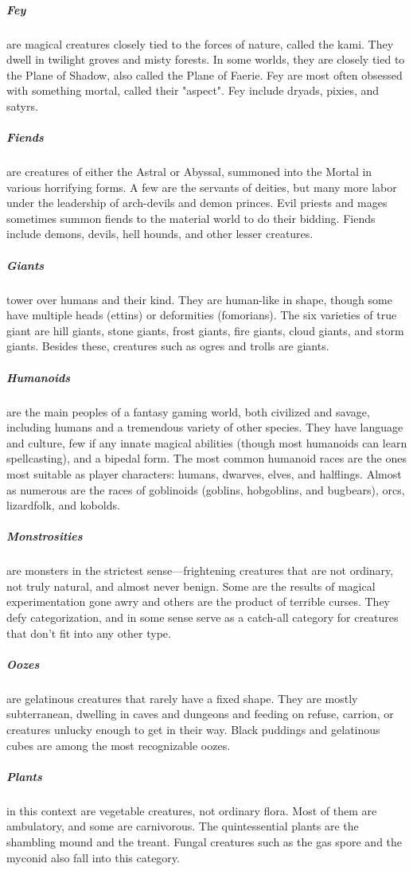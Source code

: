 \subparagraph*{Fey} are magical creatures closely tied to the forces of nature, called the kami. They dwell in twilight groves and misty forests. In some worlds, they are closely tied to the Plane of Shadow, also called the Plane of Faerie. Fey are most often obsessed with something mortal, called their "aspect". Fey include dryads, pixies, and satyrs.

\subparagraph*{Fiends} are creatures of either the Astral or Abyssal, summoned into the Mortal in various horrifying forms. A few are the servants of deities, but many more labor under the leadership of arch-devils and demon princes. Evil priests and mages sometimes summon fiends to the material world to do their bidding. Fiends include demons, devils, hell hounds, and other lesser creatures.

\subparagraph*{Giants} tower over humans and their kind. They are human-like in shape, though some have multiple heads (ettins) or deformities (fomorians). The six varieties of true giant are hill giants, stone giants, frost giants, fire giants, cloud giants, and storm giants. Besides these, creatures such as ogres and trolls are giants.

\subparagraph*{Humanoids} are the main peoples of a fantasy gaming world, both civilized and savage, including humans and a tremendous variety of other species. They have language and culture, few if any innate magical abilities (though most humanoids can learn spellcasting), and a bipedal form. The most common humanoid races are the ones most suitable as player characters: humans, dwarves, elves, and halflings. Almost as numerous are the races of goblinoids (goblins, hobgoblins, and bugbears), orcs, lizardfolk, and kobolds.

\subparagraph*{Monstrosities} are monsters in the strictest sense—frightening creatures that are not ordinary, not truly natural, and almost never benign. Some are the results of magical experimentation gone awry and others are the product of terrible curses. They defy categorization, and in some sense serve as a catch-all category for creatures that don't fit into any other type.

\subparagraph*{Oozes} are gelatinous creatures that rarely have a fixed shape. They are mostly subterranean, dwelling in caves and dungeons and feeding on refuse, carrion, or creatures unlucky enough to get in their way. Black puddings and gelatinous cubes are among the most recognizable oozes.

\subparagraph*{Plants} in this context are vegetable creatures, not ordinary flora. Most of them are ambulatory, and some are carnivorous. The quintessential plants are the shambling mound and the treant. Fungal creatures such as the gas spore and the myconid also fall into this category.

